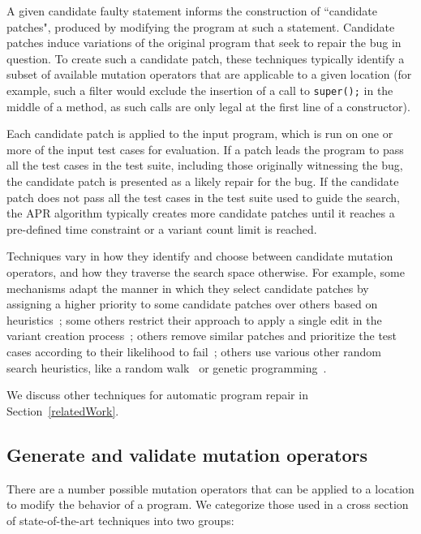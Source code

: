 \documentclass[conference]{IEEEtran}
\begin{document}
A given candidate faulty statement informs
the construction of 
``candidate patches", produced by modifying the program at such a
statement. Candidate patches induce variations of the original program 
that seek to repair the bug in question. To 
create such a candidate patch, these techniques typically identify a subset of
available mutation operators that are applicable to a given location (for
example, such a filter would exclude the insertion of a call to
\texttt{super();} in the middle of a method, as such calls are only legal at the
first line of a constructor). 

Each candidate patch is applied to the input program, which is run on
one or more of the input test cases for evaluation.  If a patch leads the
program to 
pass all the test cases in the test suite, including those originally witnessing
the bug, the candidate patch is presented as a likely repair for the bug. 
If the candidate patch does not pass all the test cases in 
the test suite used to guide the search, the APR
algorithm typically creates more candidate patches 
until it reaches a pre-defined time constraint or a variant count limit is reached. 

Techniques vary in how they identify and choose between candidate mutation
operators, and how they traverse the search space otherwise. For example, some
mechanisms adapt the manner in which they select candidate patches by assigning
a higher priority to some candidate patches over others based on heuristics~\cite{long16proph};
some others restrict their approach to apply a single edit in the variant
creation process~\cite{Qi13TrpAutoR}; others remove similar patches and prioritize the test cases
according to their likelihood to fail~\cite{Weimer13}; others use various other
random search heuristics, like a random walk~\cite{debroy10} or genetic
programming~\cite{kim2013,legoues12}. 

We discuss other techniques for automatic program repair in
Section~\ref{relatedWork}.

\subsection{Generate and validate mutation operators} 
\label{categorization}

There are a number possible mutation operators that can be applied to a location 
to modify the behavior of a program.  We categorize those used in a cross
section of state-of-the-art techniques into two groups: 
\end{document}
